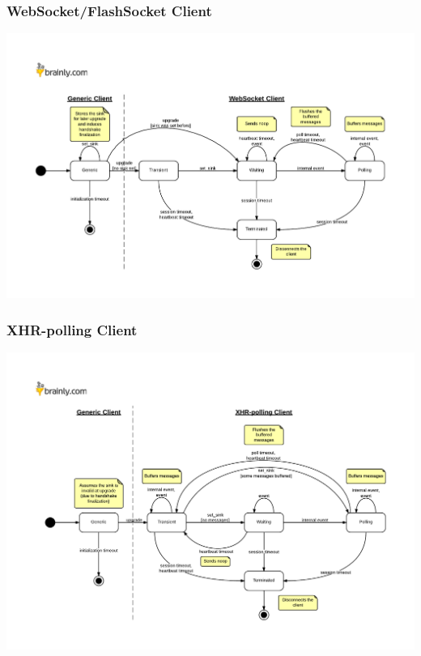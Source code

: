 \documentclass[a4paper]{article}
\begin{document}
\begin{landscape}
\subsubsection{WebSocket/FlashSocket Client}
\label{sec-7-1-2}

\begin{center}
\includegraphics[scale=0.95]{./img/websocket_client.pdf}
\end{center}
\subsubsection{XHR-polling Client}
\label{sec-7-1-3}

\begin{center}
\includegraphics[scale=0.8]{./img/xhr_polling_client.pdf}
\end{center}

\end{landscape}
\end{document}
